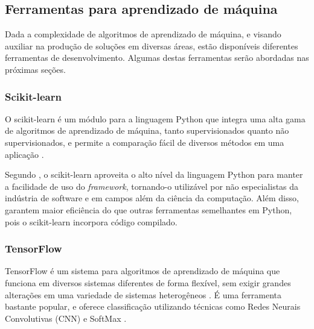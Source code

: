 \subsection{Ferramentas para aprendizado de máquina}
\label{sec:ml_tools}

Dada a complexidade de algoritmos de aprendizado de máquina, e visando auxiliar na produção de soluções em diversas áreas, estão disponíveis diferentes ferramentas de desenvolvimento. Algumas destas ferramentas serão abordadas nas próximas seções.

\subsubsection{Scikit-learn}
\label{sec:ml_sklearn}

O scikit-learn é um módulo para a linguagem Python que integra uma alta gama de algoritmos de aprendizado de máquina, tanto supervisionados quanto não supervisionados, e permite a comparação fácil de diversos métodos em uma aplicação \cite{pedregosa:2011}.

Segundo , o scikit-learn aproveita o alto nível da linguagem Python para manter a facilidade de uso do \textit{framework}, tornando-o utilizável por não especialistas da indústria de software e em campos além da ciência da computação. Além disso,  garantem maior eficiência do que outras ferramentas semelhantes em Python, pois o scikit-learn incorpora código compilado.


\subsubsection{TensorFlow}
\label{sec:ml_tf}

TensorFlow é um sistema para algoritmos de aprendizado de máquina que funciona em diversos sistemas diferentes de forma flexível, sem exigir grandes alterações em uma variedade de sistemas heterogêneos \cite{abadi:2016}. É uma ferramenta bastante popular, e oferece classificação utilizando técnicas como Redes Neurais Convolutivas (CNN) e SoftMax \cite{ertram:2017}.


